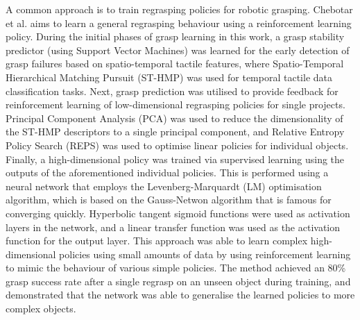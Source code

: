 \documentclass[11pt, a4paper]{report}
\begin{document}
A common approach is to train regrasping policies for robotic grasping. Chebotar et al. \cite{Chebotar_2017} aims to learn a general regrasping behaviour using a reinforcement learning policy. During the initial phases of grasp learning in this work, a grasp stability predictor (using Support Vector Machines) was learned for the early detection of grasp failures based on spatio-temporal tactile features, where Spatio-Temporal Hierarchical Matching Pursuit (ST-HMP) was used for temporal tactile data classification tasks. Next, grasp prediction was utilised to provide feedback for reinforcement learning of low-dimensional regrasping policies for single projects. Principal Component Analysis (PCA) was used to reduce the dimensionality of the ST-HMP descriptors to a single principal component, and Relative Entropy Policy Search (REPS) was used to optimise linear policies for individual objects. Finally, a high-dimensional policy was trained via supervised learning using the outputs of the aforementioned individual policies. This is performed using a neural network that employs the Levenberg-Marquardt (LM) optimisation algorithm, which is based on the Gauss-Netwon algorithm that is famous for converging quickly. Hyperbolic tangent sigmoid functions were used as activation layers in the network, and a linear transfer function was used as the activation function for the output layer. This approach was able to learn complex high-dimensional policies using small amounts of data by using reinforcement learning to mimic the behaviour of various simple policies. The method achieved an 80\% grasp success rate after a single regrasp on an unseen object during training, and demonstrated that the network was able to generalise the learned policies to more complex objects.\\
\end{document}
